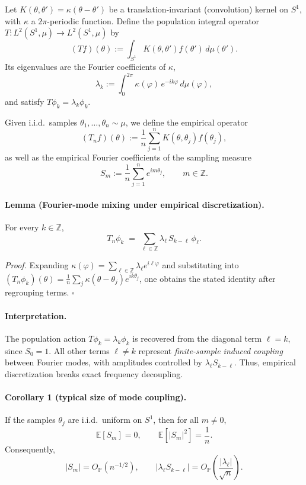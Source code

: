 Let \(K(\theta,\theta') = \kappa(\theta-\theta')\) be a translation-invariant (convolution) kernel on \(S^1\),
with \(\kappa\) a \(2\pi\)-periodic function.
Define the population integral operator \(T : L^2(S^1,\mu) \to L^2(S^1,\mu)\) by
\[
	(Tf)(\theta) := \int_{S^1} K(\theta,\theta') f(\theta') \, d\mu(\theta') .
\]
Its eigenvalues are the Fourier coefficients of \(\kappa\),
\[
	\lambda_k := \int_{0}^{2\pi} \kappa(\varphi)\, e^{-ik\varphi}\, d\mu(\varphi),
\]
and satisfy \(T\phi_k = \lambda_k \phi_k\).

Given i.i.d.\ samples \(\theta_1,\dots,\theta_n \sim \mu\), we define the empirical operator
\[
	(T_n f)(\theta) := \frac{1}{n} \sum_{j=1}^n K(\theta,\theta_j) f(\theta_j),
\]
as well as the empirical Fourier coefficients of the sampling measure
\[
	S_m := \frac{1}{n} \sum_{j=1}^n e^{im\theta_j}, \qquad m \in \mathbb{Z}.
\]

\paragraph{Lemma (Fourier-mode mixing under empirical discretization).}
For every \(k \in \mathbb{Z}\),
\[
	T_n \phi_k \;=\; \sum_{\ell \in \mathbb{Z}} \lambda_\ell\, S_{k-\ell}\, \phi_\ell .
\]

\emph{Proof.}
Expanding \(\kappa(\varphi) = \sum_{\ell \in \mathbb{Z}} \lambda_\ell e^{i\ell \varphi}\) and substituting into
\((T_n \phi_k)(\theta) = \frac{1}{n} \sum_j \kappa(\theta-\theta_j) e^{ik\theta_j}\),
one obtains the stated identity after regrouping terms.
\hfill\(\square\)

\paragraph{Interpretation.}
The population action \(T\phi_k = \lambda_k \phi_k\) is recovered from the diagonal term \(\ell=k\),
since \(S_0=1\).
All other terms \(\ell \neq k\) represent \emph{finite-sample induced coupling} between Fourier modes,
with amplitudes controlled by \(\lambda_\ell S_{k-\ell}\).
Thus, empirical discretization breaks exact frequency decoupling.

\paragraph{Corollary 1 (typical size of mode coupling).}
If the samples \(\theta_j\) are i.i.d.\ uniform on \(S^1\), then for all \(m \neq 0\),
\[
	\mathbb{E}[S_m] = 0,
	\qquad
	\mathbb{E}[|S_m|^2] = \frac{1}{n}.
\]
Consequently,
\[
	|S_m| = O_{\mathbb{P}}(n^{-1/2}),
	\qquad
	|\lambda_\ell S_{k-\ell}| = O_{\mathbb{P}}\!\left(\frac{|\lambda_\ell|}{\sqrt{n}}\right).
\]

